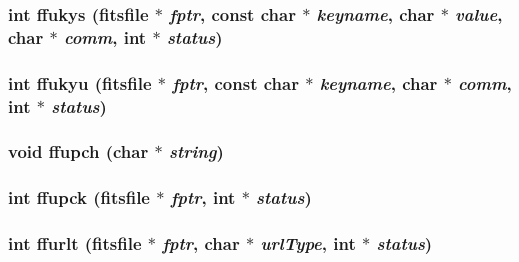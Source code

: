\subsubsection{\setlength{\rightskip}{0pt plus 5cm}int ffukys (\bf{fitsfile} $\ast$ {\em fptr}, const char $\ast$ {\em keyname}, char $\ast$ {\em value}, char $\ast$ {\em comm}, int $\ast$ {\em status})}\label{fitsio__64_8h_f2361053199299cb14085a216f6ea150}


\subsubsection{\setlength{\rightskip}{0pt plus 5cm}int ffukyu (\bf{fitsfile} $\ast$ {\em fptr}, const char $\ast$ {\em keyname}, char $\ast$ {\em comm}, int $\ast$ {\em status})}\label{fitsio__64_8h_1693ffec7e5ec0faf0d81491528af4d5}


\subsubsection{\setlength{\rightskip}{0pt plus 5cm}void ffupch (char $\ast$ {\em string})}\label{fitsio__64_8h_04d7a1a291fdea65a0d6033416d3185b}


\subsubsection{\setlength{\rightskip}{0pt plus 5cm}int ffupck (\bf{fitsfile} $\ast$ {\em fptr}, int $\ast$ {\em status})}\label{fitsio__64_8h_755efc77a596aa5aafcab3eed4b72c77}


\subsubsection{\setlength{\rightskip}{0pt plus 5cm}int ffurlt (\bf{fitsfile} $\ast$ {\em fptr}, char $\ast$ {\em url\-Type}, int $\ast$ {\em status})}\label{fitsio__64_8h_64dfbe3d89deaba3358478ef9da6cf9d}


